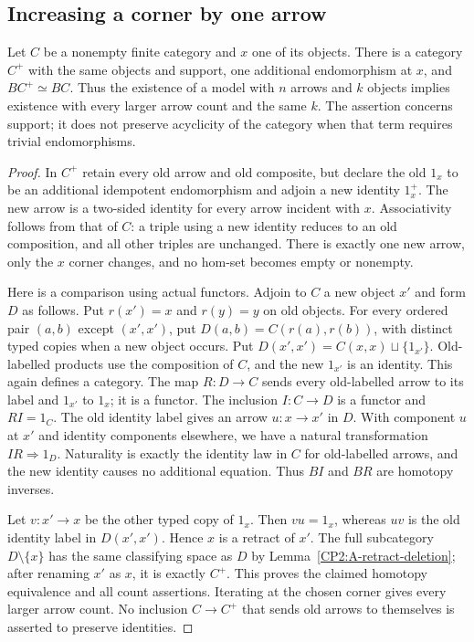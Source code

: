 \subsection{Increasing a corner by one arrow}
\begin{lemma}
\label{CP2:A-identity-padding}
Let $C$ be a nonempty finite category and $x$ one of its objects.
There is a category $C^+$ with the same objects and support, one
additional endomorphism at $x$, and $BC^+\simeq BC$. Thus the
existence of a model with $n$ arrows and $k$ objects implies
existence with every larger arrow count and the same $k$.
The assertion concerns support; it does not preserve acyclicity
of the category when that term requires trivial endomorphisms.
\end{lemma}
\begin{proof}
In $C^+$ retain every old arrow and old composite, but declare
the old $1_x$ to be an additional idempotent endomorphism and
adjoin a new identity $1_x^+$. The new arrow is a two-sided
identity for every arrow incident with $x$. Associativity
follows from that of $C$: a triple using a new identity reduces
to an old composition, and all other triples are unchanged.
There is exactly one new arrow, only the $x$ corner changes,
and no hom-set becomes empty or nonempty.

Here is a comparison using actual functors. Adjoin to $C$ a
new object $x'$ and form $D$ as follows. Put $r(x')=x$ and
$r(y)=y$ on old objects. For every ordered pair $(a,b)$ except
$(x',x')$, put $D(a,b)=C(r(a),r(b))$, with distinct typed copies
when a new object occurs. Put
$D(x',x')=C(x,x)\sqcup\{1_{x'}\}$. Old-labelled products use
the composition of $C$, and the new $1_{x'}$ is an identity.
This again defines a category. The map $R:D\to C$ sends every
old-labelled arrow to its label and $1_{x'}$ to $1_x$; it is
a functor. The inclusion $I:C\to D$ is a functor and $RI=1_C$.
The old identity label gives an arrow $u:x\to x'$ in $D$.
With component $u$ at $x'$ and identity components elsewhere,
we have a natural transformation $IR\Rightarrow1_D$.
Naturality is exactly the identity law in $C$ for old-labelled
arrows, and the new identity causes no additional equation.
Thus $BI$ and $BR$ are homotopy inverses.

Let $v:x'\to x$ be the other typed copy of $1_x$. Then
$vu=1_x$, whereas $uv$ is the old identity label in
$D(x',x')$. Hence $x$ is a retract of $x'$. The full
subcategory $D\setminus\{x\}$ has the same classifying
space as $D$ by Lemma~\ref{CP2:A-retract-deletion}; after
renaming $x'$ as $x$, it is exactly $C^+$.
This proves the claimed homotopy equivalence and all count
assertions. Iterating at the chosen corner gives every larger
arrow count. No inclusion $C\to C^+$ that sends old arrows
to themselves is asserted to preserve identities.
\end{proof}
